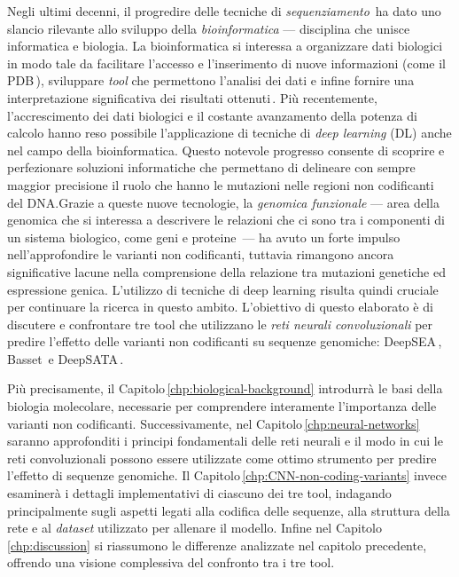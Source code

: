 Negli ultimi decenni, il progredire delle tecniche di \textsl{sequenziamento}\,\cite{pareek2011sequencing} ha dato uno slancio rilevante allo sviluppo della \textsl{bioinformatica} — disciplina che unisce informatica e biologia. La bioinformatica si interessa a organizzare dati biologici in modo tale da facilitare l'accesso e l'inserimento di nuove informazioni (come il \acs{PDB}\,\cite{burley2017protein}), sviluppare \textsl{tool} che permettono l'analisi dei dati e infine fornire una interpretazione significativa dei risultati ottenuti\,\cite{luscombe2001bioinformatics}. Più recentemente, l'accrescimento dei dati biologici e il costante avanzamento della potenza di calcolo hanno reso possibile l'applicazione di tecniche di \textsl{deep learning} (\acs{DL}) anche nel campo della bioinformatica. Questo notevole progresso consente di scoprire e perfezionare soluzioni informatiche che permettano di delineare con sempre maggior precisione il ruolo che hanno le mutazioni nelle regioni non codificanti del \acs{DNA}.\@ Grazie a queste nuove tecnologie, la \textsl{genomica funzionale} — area della genomica che si interessa a descrivere le relazioni che ci sono tra i componenti di un sistema biologico, come geni e proteine\,\cite{caudai2021ai} — ha avuto un forte impulso nell'approfondire le varianti non codificanti, tuttavia rimangono ancora significative lacune nella comprensione della relazione tra mutazioni genetiche ed espressione genica. L'utilizzo di tecniche di deep learning risulta quindi cruciale per continuare la ricerca in questo ambito. L'obiettivo di questo elaborato è di discutere e confrontare tre tool che utilizzano le \textsl{reti neurali convoluzionali} per predire l'effetto delle varianti non codificanti su sequenze genomiche: DeepSEA\,\cite{zhou2015predicting}, Basset\,\cite{kelley2016basset} e DeepSATA\,\cite{ma2023deepsata}.

Più precisamente, il Capitolo\,\ref{chp:biological-background} introdurrà le basi della biologia molecolare, necessarie per comprendere interamente l'importanza delle varianti non codificanti. Successivamente, nel Capitolo\,\ref{chp:neural-networks} saranno approfonditi i principi fondamentali delle reti neurali e il modo in cui le reti convoluzionali possono essere utilizzate come ottimo strumento per predire l'effetto di sequenze genomiche. Il Capitolo\,\ref{chp:CNN-non-coding-variants} invece esaminerà i dettagli implementativi di ciascuno dei tre tool, indagando principalmente sugli aspetti legati alla codifica delle sequenze, alla struttura della rete e al \textsl{dataset} utilizzato per allenare il modello. Infine nel Capitolo\,\ref{chp:discussion} si riassumono le differenze analizzate nel capitolo precedente, offrendo una visione complessiva del confronto tra i tre tool.

